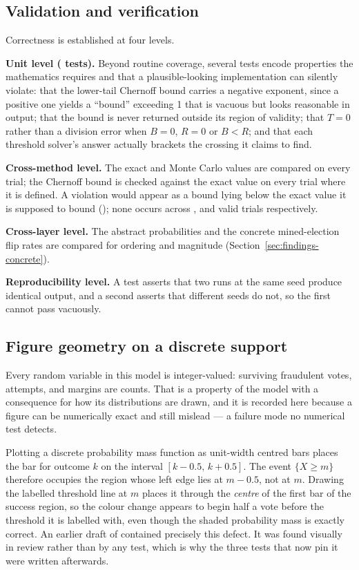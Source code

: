 \subsection{Validation and verification}
\label{sec:method-validation}

Correctness is established at four levels.

\textbf{Unit level (\TestCount{} tests).} Beyond routine coverage, several tests
encode properties the mathematics requires and that a plausible-looking
implementation can silently violate: that the lower-tail Chernoff bound
carries a negative exponent, since a positive one yields a ``bound''
exceeding 1 that is vacuous but looks reasonable in output; that the
bound is never returned outside its region of validity; that $T = 0$
rather than a division error when $B = 0$, $R = 0$ or $B < R$; and that
each threshold solver's answer actually brackets the crossing it claims
to find.

\textbf{Cross-method level.} The exact and Monte Carlo values are
compared on every trial; the Chernoff bound is checked against the
exact value on every trial where it is defined. A violation would
appear as a bound lying below the exact value it is supposed to bound
(); none occurs across \BriberyChernoffValid{},
\SybilChernoffValid{} and \BallotStuffingChernoffValid{} valid trials
respectively.

\textbf{Cross-layer level.} The abstract probabilities and the concrete
mined-election flip rates are compared for ordering and magnitude
(Section~\ref{sec:findings-concrete}).

\textbf{Reproducibility level.} A test asserts that two runs at the same
seed produce identical output, and a second asserts that different
seeds do not, so the first cannot pass vacuously.

\subsection{Figure geometry on a discrete support}
\label{sec:method-figure-geometry}

Every random variable in this model is integer-valued: surviving
fraudulent votes, attempts, and margins are counts. That is a property
of the model with a consequence for how its distributions are drawn,
and it is recorded here because a figure can be numerically exact and
still mislead --- a failure mode no numerical test detects.

Plotting a discrete probability mass function as unit-width centred
bars places the bar for outcome $k$ on the interval $[k-0.5,\,k+0.5]$.
The event $\{X \geq m\}$ therefore occupies the region whose left edge
lies at $m - 0.5$, not at $m$. Drawing the labelled threshold line at
$m$ places it through the \emph{centre} of the first bar of the success
region, so the colour change appears to begin half a vote before the
threshold it is labelled with, even though the shaded probability mass
is exactly correct. An earlier draft of  contained
precisely this defect. It was found visually in review rather than by
any test, which is why the three tests that now pin it were written
afterwards.

